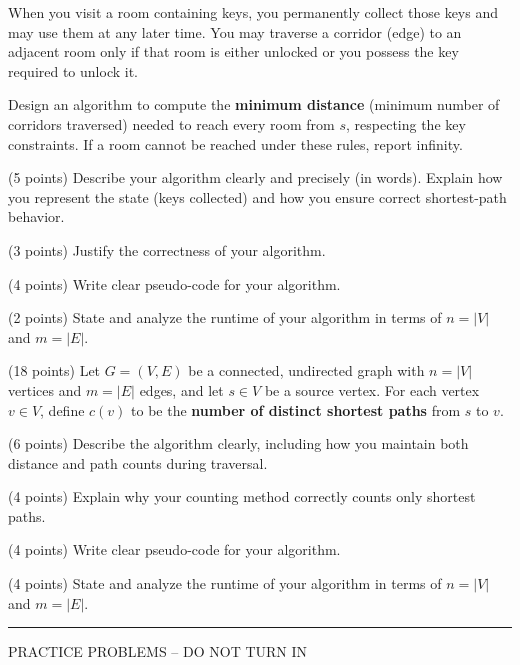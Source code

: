 \documentclass[11  pt]{article}
\begin{document}
When you visit a room containing keys, you permanently collect those keys and may use them at any later time.  
You may traverse a corridor (edge) to an adjacent room only if that room is either unlocked or you possess the key required to unlock it.

Design an algorithm to compute the \textbf{minimum distance} (minimum number of corridors traversed) needed to reach every room from $s$, respecting the key constraints.  
If a room cannot be reached under these rules, report infinity.

\babc
\item (5 points) 
Describe your algorithm clearly and precisely (in words). 
Explain how you represent the state (keys collected) and how you ensure correct shortest-path behavior.

\item (3 points) 
Justify the correctness of your algorithm. 

\item (4 points) 
Write clear pseudo-code for your algorithm.

\item (2 points) 
State and analyze the runtime of your algorithm in terms of $n=|V|$ and $m=|E|$.
\eabc


\vspace{0.5in}
\problem (18 points)
Let $G = (V, E)$ be a connected, undirected graph with $n = |V|$ vertices and $m = |E|$ edges, and let $s \in V$ be a source vertex.  
For each vertex $v \in V$, define $c(v)$ to be the \textbf{number of distinct shortest paths} from $s$ to $v$.

\babc
\item (6 points) 
Describe the algorithm clearly, including how you maintain both distance and path counts during traversal.

\item (4 points) 
Explain why your counting method correctly counts only shortest paths.

\item (4 points) 
Write clear pseudo-code for your algorithm.

\item (4 points) 
State and analyze the runtime of your algorithm in terms of $n=|V|$ and $m=|E|$.
\eabc


\newpage
\hrule
\vspace{0.5in}
\begin{center}
PRACTICE PROBLEMS -- DO NOT TURN IN
\end{center}
\vspace{0.5in}
\noindent
\end{document}
